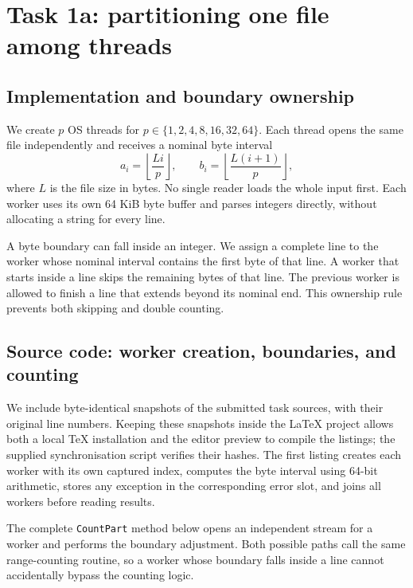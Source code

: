 \chapter{Task 1a: partitioning one file among threads}
\section{Implementation and boundary ownership}
We create \(p\) OS threads for \(p\in\{1,2,4,8,16,32,64\}\). Each thread opens the same file independently and receives a nominal byte interval
\begin{equation}
a_i=\left\lfloor\frac{Li}{p}\right\rfloor,\qquad
b_i=\left\lfloor\frac{L(i+1)}{p}\right\rfloor,
\end{equation}
where \(L\) is the file size in bytes. No single reader loads the whole input first. Each worker uses its own 64 KiB byte buffer and parses integers directly, without allocating a string for every line.

A byte boundary can fall inside an integer. We assign a complete line to the worker whose nominal interval contains the first byte of that line. A worker that starts inside a line skips the remaining bytes of that line. The previous worker is allowed to finish a line that extends beyond its nominal end. This ownership rule prevents both skipping and double counting.

\section{Source code: worker creation, boundaries, and counting}
We include byte-identical snapshots of the submitted task sources, with their original line numbers. Keeping these snapshots inside the LaTeX project allows both a local TeX installation and the editor preview to compile the listings; the supplied synchronisation script verifies their hashes. The first listing creates each worker with its own captured index, computes the byte interval using 64-bit arithmetic, stores any exception in the corresponding error slot, and joins all workers before reading results.


The complete \texttt{CountPart} method below opens an independent stream for a worker and performs the boundary adjustment. Both possible paths call the same range-counting routine, so a worker whose boundary falls inside a line cannot accidentally bypass the counting logic.

